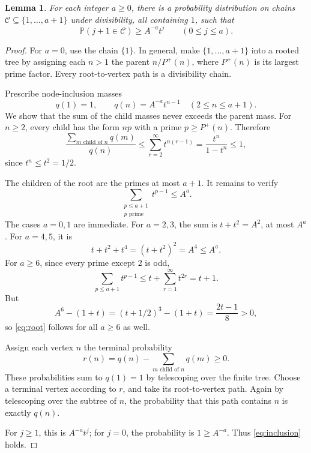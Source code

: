 \documentclass[11pt,a4paper]{article}
\newtheorem{lemma}[theorem]{Lemma}
\theoremstyle{remark}\newtheorem*{remark}{Remark}
\newcommand{\PP}{\mathbb P}
\begin{document}
\begin{lemma}\label{lem:chains}
For each integer $a\ge0$, there is a probability distribution on chains $\mathcal C\subseteq\{1,\ldots,a+1\}$ under divisibility, all containing $1$, such that
\begin{equation}\label{eq:inclusion}
\PP(j+1\in\mathcal C)\ge A^{-a}t^j
\qquad(0\le j\le a).
\end{equation}
\end{lemma}
\begin{proof}
For $a=0$, use the chain $\{1\}$. In general, make $\{1,\ldots,a+1\}$ into a rooted tree by assigning each $n>1$ the parent $n/P^+(n)$, where $P^+(n)$ is its largest prime factor. Every root-to-vertex path is a divisibility chain.

Prescribe node-inclusion masses
\[
q(1)=1,\qquad q(n)=A^{-a}t^{n-1}\quad(2\le n\le a+1).
\]
We show that the sum of the child masses never exceeds the parent mass.
For $n\ge2$, every child has the form $np$ with a prime $p\ge P^+(n)$. Therefore
\[
\frac{\sum_{m\text{ child of }n}q(m)}{q(n)}
\le\sum_{r=2}^{\infty}t^{n(r-1)}
=\frac{t^n}{1-t^n}\le1,
\]
since $t^n\le t^2=1/2$.

The children of the root are the primes at most $a+1$. It remains to verify
\begin{equation}\label{eq:root}
\sum_{\substack{p\le a+1\\p\text{ prime}}}t^{p-1}\le A^a.
\end{equation}
The cases $a=0,1$ are immediate. For $a=2,3$, the sum is $t+t^2=A^2$, at most $A^a$. For $a=4,5$, it is
\[
t+t^2+t^4=(t+t^2)^2=A^4\le A^a.
\]
For $a\ge6$, since every prime except $2$ is odd,
\[
\sum_{p\le a+1}t^{p-1}
\le t+\sum_{r=1}^{\infty}t^{2r}
=t+1.
\]
But
\[
A^6-(1+t)=(t+1/2)^3-(1+t)=\frac{2t-1}{8}>0,
\]
so \eqref{eq:root} follows for all $a\ge6$ as well.

Assign each vertex $n$ the terminal probability
\[
r(n)=q(n)-\sum_{m\text{ child of }n}q(m)\ge0.
\]
These probabilities sum to $q(1)=1$ by telescoping over the finite tree. Choose a terminal vertex according to $r$, and take its root-to-vertex path. Again by telescoping over the subtree of $n$, the probability that this path contains $n$ is exactly $q(n)$.

For $j\ge1$, this is $A^{-a}t^j$; for $j=0$, the probability is $1\ge A^{-a}$. Thus \eqref{eq:inclusion} holds.
\end{proof}
\end{document}
